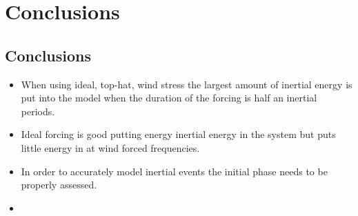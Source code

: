 \chapter{Conclusions}
\label{chapter_conslucions}
 \section{Conclusions}

\begin{itemize}
	\item When using ideal, top-hat, wind stress the largest amount of inertial energy is put into
	the model when the duration of the forcing is half an inertial periods.
	
	\item Ideal forcing is good putting energy inertial energy in the system but puts little energy
	in at wind forced frequencies. 
	
	\item In order to accurately model inertial events the initial phase needs to be properly assessed.
	
	\item {}
\end{itemize}
